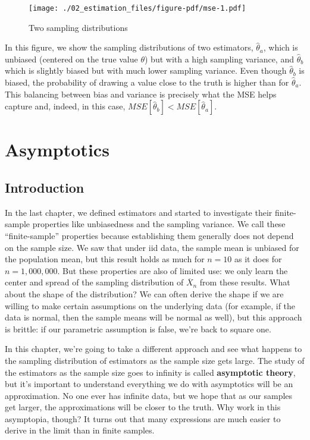 \documentclass[
  letterpaper,
  DIV=11,
  numbers=noendperiod]{scrreprt}
\newcommand{\Xbar}{\overline{X}}
\theoremstyle{definition}
\theoremstyle{plain}
\theoremstyle{definition}
\theoremstyle{remark}
\begin{document}
\begin{figure}

{\centering \texttt{[image: ./02\_estimation\_files/figure-pdf/mse-1.pdf]}

}

\caption{Two sampling distributions}

\end{figure}

In this figure, we show the sampling distributions of two estimators,
\(\widehat{\theta}_a\), which is unbiased (centered on the true value
\(\theta\)) but with a high sampling variance, and
\(\widehat{\theta}_b\) which is slightly biased but with much lower
sampling variance. Even though \(\widehat{\theta}_b\) is biased, the
probability of drawing a value close to the truth is higher than for
\(\widehat{\theta}_a\). This balancing between bias and variance is
precisely what the MSE helps capture and, indeed, in this case,
\(MSE[\widehat{\theta}_b] < MSE[\widehat{\theta}_a]\).


\hypertarget{asymptotics}{%
\chapter{Asymptotics}\label{asymptotics}}

\hypertarget{introduction-2}{%
\section{Introduction}\label{introduction-2}}

In the last chapter, we defined estimators and started to investigate
their finite-sample properties like unbiasedness and the sampling
variance. We call these ``finite-sample'' properties because
establishing them generally does not depend on the sample size. We saw
that under iid data, the sample mean is unbiased for the population
mean, but this result holds as much for \(n = 10\) as it does for
\(n = 1,000,000\). But these properties are also of limited use: we only
learn the center and spread of the sampling distribution of \(\Xbar_n\)
from these results. What about the shape of the distribution? We can
often derive the shape if we are willing to make certain assumptions on
the underlying data (for example, if the data is normal, then the sample
means will be normal as well), but this approach is brittle: if our
parametric assumption is false, we're back to square one.

In this chapter, we're going to take a different approach and see what
happens to the sampling distribution of estimators as the sample size
gets large. The study of the estimators as the sample size goes to
infinity is called \textbf{asymptotic theory}, but it's important to
understand everything we do with asymptotics will be an approximation.
No one ever has infinite data, but we hope that as our samples get
larger, the approximations will be closer to the truth. Why work in this
asymptopia, though? It turns out that many expressions are much easier
to derive in the limit than in finite samples.
\end{document}
